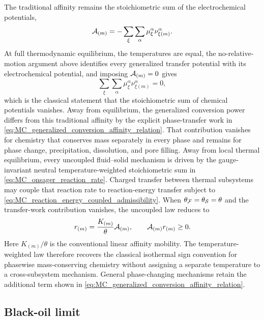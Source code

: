 The traditional affinity remains the stoichiometric sum of the
electrochemical potentials,
%
\begin{equation}
	\mathcal{A}_{(m)}
	=
	-\sum_\xi\sum_\alpha
	\mu_\xi^\alpha
	\nu_{\xi (m)}^\alpha .
	\label{eq:classical_affinity_projection}
\end{equation}
%
At full thermodynamic equilibrium, the temperatures are equal, the
no-relative-motion argument above identifies every generalized transfer
potential with its electrochemical potential, and imposing
\(\mathcal{A}_{(m)}=0\) gives
%
\begin{equation}
	\sum_\xi\sum_\alpha \mu_\xi^\alpha\nu_{\xi (m)}^\alpha=0,
	\label{eq:classical_equilibrium_affinity}
\end{equation}
%
which is the classical statement that the stoichiometric sum of chemical
potentials vanishes.  Away from equilibrium, the generalized conversion power
differs from this traditional affinity by the explicit phase-transfer work in
\eqref{eq:MC_generalized_conversion_affinity_relation}.  That contribution
vanishes for chemistry that conserves mass separately in every phase and
remains for phase change, precipitation, dissolution, and pore filling.  Away
from local thermal equilibrium, every uncoupled fluid--solid mechanism is
driven by the gauge-invariant neutral temperature-weighted stoichiometric sum
in \eqref{eq:MC_onsager_reaction_rate}.  Charged transfer between thermal
subsystems may couple that reaction rate to reaction-energy transfer subject
to \eqref{eq:MC_reaction_energy_coupled_admissibility}.  When
\(\theta_{\mathcal{F}}=\theta_{\mathcal{S}}=\theta\) and the transfer-work contribution
vanishes, the uncoupled law reduces to
%
\begin{equation}
	r_{(m)}
	=
	\frac{K_{(m)}}{\theta}\mathcal{A}_{(m)},
	\qquad \mathcal{A}_{(m)}r_{(m)}\ge 0 .
	\label{eq:classical_kinetic_affinity_closure}
\end{equation}
%
Here \(K_{(m)}/\theta\) is the conventional linear affinity mobility.  The
temperature-weighted law therefore recovers the classical isothermal sign
convention for phasewise mass-conserving chemistry without assigning a separate
temperature to a cross-subsystem mechanism.  General phase-changing mechanisms
retain the additional term shown in
\eqref{eq:MC_generalized_conversion_affinity_relation}.

\subsection{Black-oil limit}
\label{sec:black_oil_limit}

